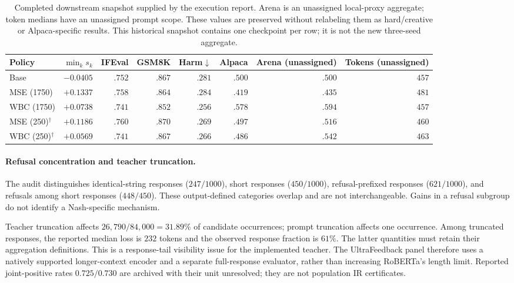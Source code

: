 \documentclass{article}
\theoremstyle{remark}
\theoremstyle{plain}
\begin{document}
\begin{table}[t]
\centering\scriptsize
\setlength{\tabcolsep}{3.5pt}
\caption{Completed downstream snapshot supplied by the execution report. Arena is an unassigned local-proxy aggregate; token medians have an unassigned prompt scope. These values are preserved without relabeling them as hard/creative or Alpaca-specific results. This historical snapshot contains one checkpoint per row; it is not the new three-seed aggregate.}
\label{tab:reported-downstream}
\begin{tabular}{lrrrrrrr}
\toprule
Policy & $\min_k s_k$ & IFEval & GSM8K & Harm$\downarrow$ & Alpaca & Arena (unassigned) & Tokens (unassigned)\\
\midrule
Base & $-0.0405$ & $.752$ & $.867$ & $.281$ & $.500$ & $.500$ & $457$\\
MSE (1750) & $+0.1337$ & $.758$ & $.864$ & $.284$ & $.419$ & $.435$ & $481$\\
WBC (1750) & $+0.0738$ & $.741$ & $.852$ & $.256$ & $.578$ & $.594$ & $457$\\
MSE (250)$^\dagger$ & $+0.1186$ & $.760$ & $.870$ & $.269$ & $.497$ & $.516$ & $460$\\
WBC (250)$^\dagger$ & $+0.0569$ & $.741$ & $.867$ & $.266$ & $.486$ & $.542$ & $463$\\
\bottomrule
\end{tabular}
\end{table}

\paragraph{Refusal concentration and teacher truncation.}
The audit distinguishes identical-string responses ($247/1000$), short responses ($450/1000$), refusal-prefixed responses ($621/1000$), and refusals among short responses ($448/450$). These output-defined categories overlap and are not interchangeable. Gains in a refusal subgroup do not identify a Nash-specific mechanism.

Teacher truncation affects $26{,}790/84{,}000=31.89\%$ of candidate occurrences; prompt truncation affects one occurrence. Among truncated responses, the reported median loss is $232$ tokens and the observed response fraction is $61\%$. The latter quantities must retain their aggregation definitions. This is a response-tail visibility issue for the implemented teacher. The UltraFeedback panel therefore uses a natively supported longer-context encoder and a separate full-response evaluator, rather than increasing RoBERTa's length limit. Reported joint-positive rates $0.725/0.730$ are archived with their unit unresolved; they are not population IR certificates.
\end{document}
